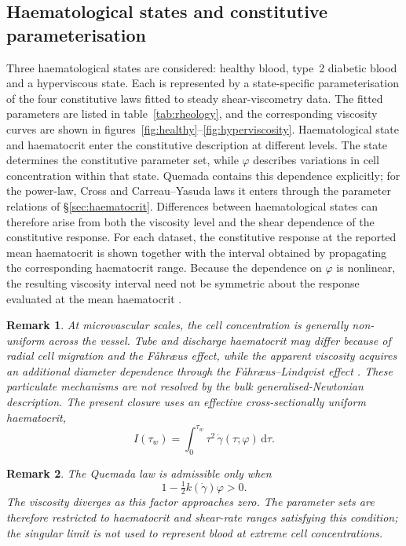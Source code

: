 \documentclass[lineno]{jfm}
\newtheorem{remark}{Remark}
\begin{document}
\subsection{Haematological states and constitutive parameterisation}
\label{sec:pathologies}
Three haematological states are considered: healthy blood, type~2 diabetic
blood and a hyperviscous state. Each is represented by a state-specific
parameterisation of the four constitutive laws fitted to steady
shear-viscometry data. The fitted parameters are listed in
table~\ref{tab:rheology}, and the corresponding viscosity curves are shown in
figures~\ref{fig:healthy}--\ref{fig:hyperviscosity}.
Haematological state and haematocrit enter the constitutive description at
different levels. The state determines the constitutive parameter set, while
$\varphi$ describes variations in cell concentration within that state.
Quemada contains this dependence explicitly; for the power-law, Cross and
Carreau--Yasuda laws it enters through the parameter relations of
\S\ref{sec:haematocrit}. Differences between haematological states can
therefore arise from both the viscosity level and the shear dependence of the
constitutive response.
For each dataset, the constitutive response at the reported mean haematocrit is
shown together with the interval obtained by propagating the corresponding
haematocrit range. Because the dependence on $\varphi$ is nonlinear, the
resulting viscosity interval need not be symmetric about the response evaluated
at the mean haematocrit
\citep{Chien1987,cho2008hemorheological}.
\begin{remark}
At microvascular scales, the cell concentration is generally non-uniform across
the vessel. Tube and discharge haematocrit may differ because of radial cell
migration and the F\aa hr\ae us effect, while the apparent viscosity acquires
an additional diameter dependence through the F\aa hr\ae us--Lindqvist effect
\citep{Popel2005}. These particulate mechanisms are not resolved by the bulk
generalised-Newtonian description. The present closure uses an effective
cross-sectionally uniform haematocrit,
\begin{equation*}
I(\tau_w)
=
\int_0^{\tau_w}
\tau^2\,
\dot\gamma(\tau;\varphi)
\,\mathrm{d}\tau .
\end{equation*}
\end{remark}
\begin{remark}
\label{rmk:quemada}
The Quemada law is admissible only when
\[
1-\tfrac12 k(\dot\gamma)\varphi>0.
\]
The viscosity diverges as this factor approaches zero. The parameter sets are
therefore restricted to haematocrit and shear-rate ranges satisfying this
condition; the singular limit is not used to represent blood at extreme cell
concentrations.
\end{remark}
\end{document}
